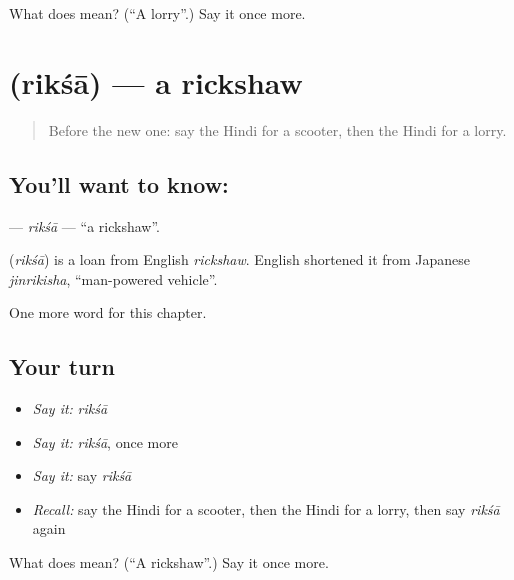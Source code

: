 \begin{tcolorbox}[breakable,colback=teal!4,colframe=teal!35!black,title={Before you move on}]
What does  mean? (\textquotedblleft{}A lorry\textquotedblright{}.) Say it once more.
\end{tcolorbox}
\section[\texorpdfstring{\hi{रिक्शा} (rikśā)}{रिक्शा (rikśā)}]{ (rikśā) — a rickshaw}

\label{lesson:HI-C204-riksa}



\begin{quote}
Before the new one: say the Hindi for a scooter, then the Hindi for a lorry.
\end{quote}

\subsection*{You'll want to know: }
\textbf{} — \emph{rikśā} — \textquotedblleft{}a rickshaw\textquotedblright{}.

\begin{cousinweb}
\textbf{} (\emph{rikśā}) is a loan from English \emph{rickshaw}. English shortened it from Japanese \emph{jinrikisha}, \textquotedblleft{}man-powered vehicle\textquotedblright{}.
\end{cousinweb}

\begin{grammarlens}[title={What you've built}]
One more word for this chapter.
\end{grammarlens}

\subsection*{Your turn}
\begin{itemize}
\raggedright
  \item \emph{Say it:} \emph{rikśā}
  \item \emph{Say it:} \emph{rikśā}, once more
  \item \emph{Say it:} say \emph{rikśā}
  \item \emph{Recall:} say the Hindi for a scooter, then the Hindi for a lorry, then say \emph{rikśā} again
\end{itemize}

\begin{tcolorbox}[breakable,colback=teal!4,colframe=teal!35!black,title={Before you move on}]
What does  mean? (\textquotedblleft{}A rickshaw\textquotedblright{}.) Say it once more.
\end{tcolorbox}
